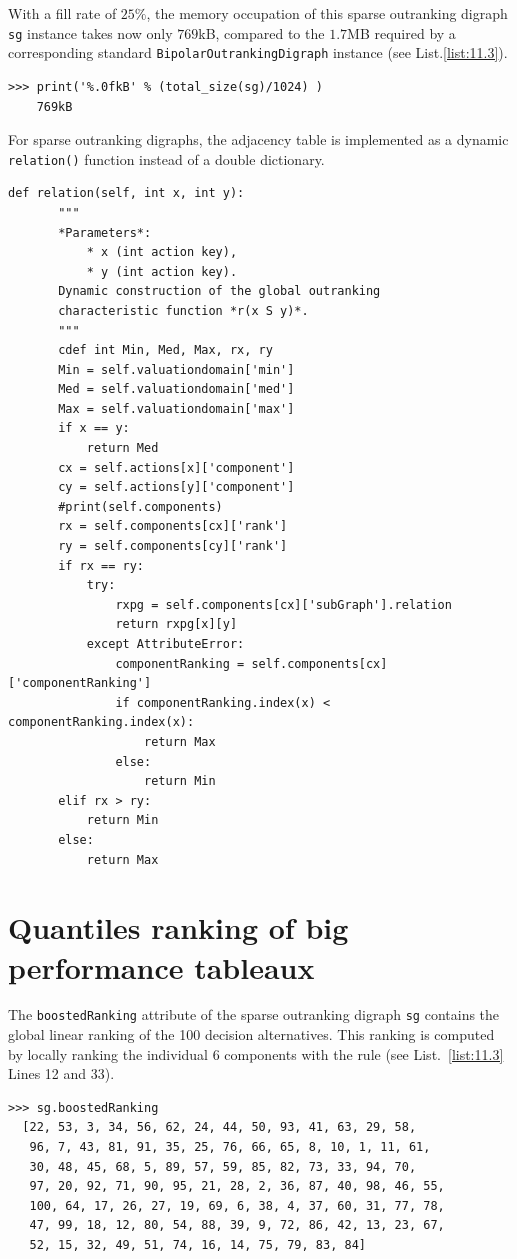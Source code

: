 With a fill rate of $25\%$, the memory occupation of this sparse outranking digraph \texttt{sg} instance takes now only $769$kB, compared to the $1.7$MB required by a corresponding standard \texttt{BipolarOutrankingDigraph} instance (see List.\vref{list:11.3}).
\begin{lstlisting}
>>> print('%.0fkB' % (total_size(sg)/1024) )
    769kB
\end{lstlisting}

For sparse outranking digraphs, the adjacency table is implemented as a dynamic \texttt{relation()} function instead of a double dictionary.
\begin{lstlisting}[caption={The \texttt{relation()} function of a sparse outranking digraph},label=list:11.4,basicstyle=\ttfamily\scriptsize]
   def relation(self, int x, int y):
       """
       *Parameters*:
           * x (int action key),
           * y (int action key).
       Dynamic construction of the global outranking
       characteristic function *r(x S y)*.
       """
       cdef int Min, Med, Max, rx, ry
       Min = self.valuationdomain['min']
       Med = self.valuationdomain['med']
       Max = self.valuationdomain['max']
       if x == y:
           return Med
       cx = self.actions[x]['component']
       cy = self.actions[y]['component']
       #print(self.components)
       rx = self.components[cx]['rank']
       ry = self.components[cy]['rank']
       if rx == ry:
           try:
               rxpg = self.components[cx]['subGraph'].relation
               return rxpg[x][y]
           except AttributeError:
               componentRanking = self.components[cx]['componentRanking']
               if componentRanking.index(x) < componentRanking.index(x):
                   return Max
               else:
                   return Min
       elif rx > ry:
           return Min
       else:
           return Max
\end{lstlisting}

\section{Quantiles ranking of big performance tableaux}
\label{sec:11.4}

The \texttt{boostedRanking} attribute of the sparse outranking digraph \texttt{sg} contains the global linear ranking of the 100 decision alternatives. This ranking is computed by locally ranking the individual 6 components with the \Copeland rule (see List.~\vref{list:11.3} Lines 12 and 33).
\begin{lstlisting}
>>> sg.boostedRanking
  [22, 53, 3, 34, 56, 62, 24, 44, 50, 93, 41, 63, 29, 58,
   96, 7, 43, 81, 91, 35, 25, 76, 66, 65, 8, 10, 1, 11, 61,
   30, 48, 45, 68, 5, 89, 57, 59, 85, 82, 73, 33, 94, 70,
   97, 20, 92, 71, 90, 95, 21, 28, 2, 36, 87, 40, 98, 46, 55,
   100, 64, 17, 26, 27, 19, 69, 6, 38, 4, 37, 60, 31, 77, 78,
   47, 99, 18, 12, 80, 54, 88, 39, 9, 72, 86, 42, 13, 23, 67,
   52, 15, 32, 49, 51, 74, 16, 14, 75, 79, 83, 84]
\end{lstlisting}

